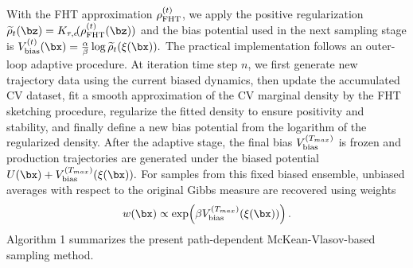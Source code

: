 \documentclass[a4paper,fleqn]{cas-sc}
\theoremstyle{definition}
\begin{document}
With the FHT approximation \(\rho_{\rm FHT}^{(t)}\), we apply the  positive regularization 
$
\widetilde\rho_t(\bz)
=
K_{\tau,\epsilon}\!(\rho_{\rm FHT}^{(t)}(\bz))
$ and the bias potential used in the next sampling stage is
$
V_{\rm bias}^{(t)}(\bx)
=
\frac{\alpha}{\beta}\log \widetilde\rho_t(\xi(\bx)).
$
%
The practical implementation follows an outer-loop adaptive procedure.
At iteration time step $n$, we first generate new trajectory data using the current biased dynamics,
then update the accumulated CV dataset, fit a smooth approximation of the CV marginal
density by the FHT sketching procedure, regularize the fitted density to ensure positivity
and stability, and finally define a new bias potential from the logarithm of the regularized
density. 
%
After the adaptive stage, the final bias \(V_{\rm bias}^{(T_{max})}\) is frozen and production trajectories are generated under the biased potential
$
U(\bx)+V_{\rm bias}^{(T_{max})}(\xi(\bx)).
$
For samples from this fixed biased ensemble, unbiased averages with respect to the original Gibbs measure are recovered using weights
\[
w(\bx)
\propto
\exp\!\left(\beta V_{\rm bias}^{(T_{max})}(\xi(\bx))\right).
\]
Algorithm 1 summarizes the present path-dependent McKean-Vlasov-based sampling method. 

\end{document}
